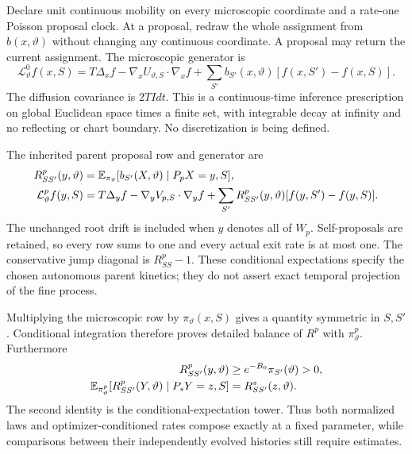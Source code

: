 Declare unit continuous mobility on every microscopic coordinate and a
rate-one Poisson proposal clock. At a proposal, redraw the whole
assignment from \(b(x,\vartheta)\) without changing any continuous
coordinate. A proposal may return the current assignment. The microscopic
generator is
\begin{equation}
\mathcal L_\vartheta^0 f(x,S)
=T\Delta_x f-\nabla_x U_{\vartheta,S}\cdot\nabla_xf
 +\sum_{S'}b_{S'}(x,\vartheta)[f(x,S')-f(x,S)].
\label{eq:rg-formation-microscopic-generator}
\end{equation}
The diffusion covariance is \(2TI dt\). This is a continuous-time
inference prescription on global Euclidean space times a finite set,
with integrable decay at infinity and no reflecting or chart boundary.
No discretization is being defined. 

The inherited parent proposal row and generator are
\begin{equation}
\begin{aligned}
R^p_{SS'}(y,\vartheta)
 &=\mathbb E_{\pi_\vartheta}
     [b_{S'}(X,\vartheta)\mid P_pX=y,S],\\
\mathcal L_\vartheta^pf(y,S)
 &=T\Delta_yf-\nabla_yV_{p,S}\cdot\nabla_yf
   +\sum_{S'}R^p_{SS'}(y,\vartheta)[f(y,S')-f(y,S)].
\end{aligned}
\label{eq:rg-formation-parent-generator}
\end{equation}
The unchanged root drift is included when \(y\) denotes all of \(W_p\).
Self-proposals are retained, so every row sums to one and every actual
exit rate is at most one. The conservative jump diagonal is
\(R^p_{SS}-1\). These conditional expectations specify the chosen
autonomous parent kinetics; they do not assert exact temporal projection
of the fine process. 

Multiplying the microscopic row by \(\pi_\vartheta(x,S)\) gives a
quantity symmetric in \(S,S'\). Conditional integration therefore
proves detailed balance of \(R^p\) with \(\pi_\vartheta^p\).
Furthermore
\begin{equation}
\begin{aligned}
R^p_{SS'}(y,\vartheta)
 &\ge e^{-B_0}\pi_{S'}(\vartheta)>0,\\
\mathbb E_{\pi_\vartheta^p}
 [R^p_{SS'}(Y,\vartheta)\mid P_sY=z,S]
 &=R^s_{SS'}(z,\vartheta).
\end{aligned}
\label{eq:rg-formation-rate-composition}
\end{equation}
The second identity is the conditional-expectation tower. Thus both
normalized laws and optimizer-conditioned rates compose exactly at a
fixed parameter, while comparisons between their independently evolved
histories still require estimates. 


